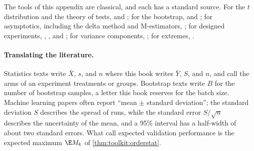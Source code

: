 \begin{refsection}
The tools of this appendix are classical, and each has a standard source. For the $t$ distribution and the theory of tests, \textcite{CasellaBerger2002} and \textcite{LehmannRomano2005}; for the bootstrap, \textcite{Efron1979} and \textcite{EfronTibshirani1993}; for asymptotics, including the delta method and M-estimators, \textcite{vanderVaart1998}; for designed experiments, \textcite{Fisher1935}, \textcite{BoxHunterHunter2005}, and \textcite{Montgomery2017}; for variance components, \textcite{SearleCasellaMcCulloch1992}; for extremes, \textcite{LeadbetterLindgrenRootzen1983}.

\paragraph{Translating the literature.} Statistics texts write $\bar X$, $s$, and $n$ where this book writes $\bar Y$, $S$, and $n$, and call the arms of an experiment treatments or groups. Bootstrap texts write $B$ for the number of bootstrap samples, a letter this book reserves for the batch size. Machine learning papers often report ``mean $\pm$ standard deviation''; the standard deviation $S$ describes the spread of runs, while the standard error $S/\sqrt n$ describes the uncertainty of the mean, and a 95\% interval has a half-width of about two standard errors. What \textcite{DodgeEtAl2019} call expected validation performance is the expected maximum $\E M_k$ of \cref{thm:toolkit:orderstat}.

\printchapterbib
\end{refsection}
